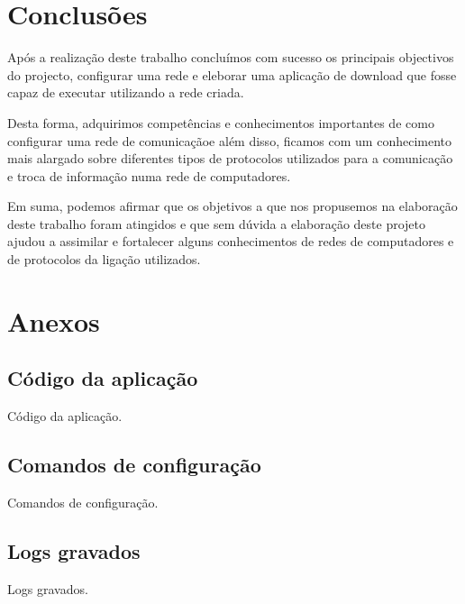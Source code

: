 \documentclass[a4paper]{article}
\begin{document}
\section{Conclusões}

Após a realização deste trabalho concluímos com sucesso os principais objectivos do projecto, configurar uma rede e eleborar uma aplicação de download que fosse capaz de executar utilizando a rede criada. 

Desta forma, adquirimos competências e conhecimentos importantes de como configurar uma rede de comunicaçãoe além disso, ficamos com um conhecimento mais alargado sobre diferentes tipos de protocolos utilizados para a comunicação e troca de informação numa rede de computadores.
 
Em suma, podemos afirmar que os objetivos a que nos propusemos na elaboração deste trabalho foram atingidos e que sem dúvida a elaboração deste projeto ajudou a assimilar e fortalecer alguns conhecimentos de redes de computadores e de protocolos da ligação utilizados.


\clearpage
{}
\renewcommand\refname{Referências}




\newpage
\appendix
\section{Anexos}

\subsection{Código da aplicação}
Código da aplicação.

\subsection{Comandos de configuração}
Comandos de configuração.

\subsection{Logs gravados}
Logs gravados.
\end{document}
